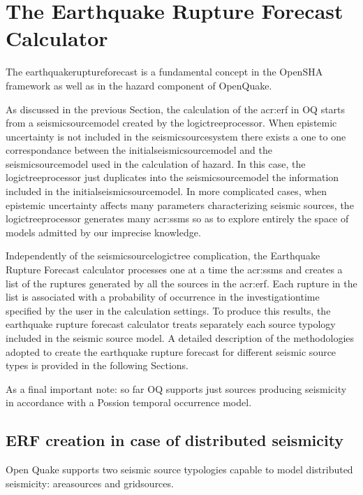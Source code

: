 %
\section{The Earthquake Rupture Forecast Calculator}
The \gls{earthquakeruptureforecast} is a fundamental concept in the OpenSHA 
framework \citep{field2003} as well as in the hazard component of OpenQuake.

As discussed in the previous Section, the calculation of the \gls{acr:erf} 
in OQ starts from a \gls{seismicsourcemodel} created by the  
\gls{logictreeprocessor}.
%
When epistemic uncertainty is not included in the \gls{seismicsourcesystem}
there exists a one to one correspondance between the 
\gls{initialseismicsourcemodel} and the \gls{seismicsourcemodel} used 
in the calculation of hazard. In this case, the \gls{logictreeprocessor} 
just duplicates into the \gls{seismicsourcemodel} the information 
included in the \gls{initialseismicsourcemodel}.
%
In more complicated cases, when epistemic uncertainty affects many 
parameters characterizing seismic sources, the \gls{logictreeprocessor} 
generates many \glspl{acr:ssm} so as to explore entirely the space 
of models admitted by our imprecise knowledge.

Independently of the \gls{seismicsourcelogictree} complication,
the Earthquake Rupture Forecast calculator processes one at a time the 
\glspl{acr:ssm} and creates a list of the ruptures generated by all 
the sources in the \gls{acr:erf}. 
%
Each rupture in the list is associated with a probability of occurrence 
in the \gls{investigationtime} specified by the user in the calculation 
settings. To produce this results, the earthquake rupture forecast 
calculator treats separately each source typology included in the 
seismic source model. A detailed description of the methodologies 
adopted to create the earthquake rupture forecast for different seismic
source types is provided in the following Sections.

As a final important note: so far OQ supports just sources 
producing seismicity in accordance with a Possion temporal occurrence 
model.
%
\subsection{ERF creation in case of distributed seismicity}
Open Quake supports two seismic source typologies capable to model 
distributed seismicity: \glspl{areasource} and \glspl{gridsource}.

